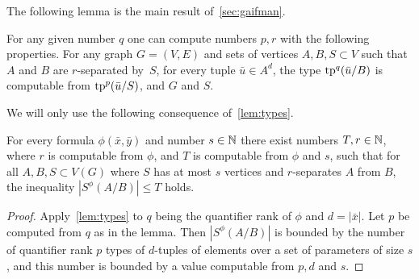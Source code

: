 The following lemma is the main result of~\cref{sec:gaifman}.




\begin{lemma}%
	\label{lem:types}
For any given number $q$
one can compute numbers $p,r$ with the following properties.	For any graph $G=(V,E)$ and sets of vertices $A,B,S\subset V$	
	such that $A$  and $B$ are $r$-separated by~$S$,
	for every tuple $\bar u\in A^{d}$, 
	the type $\mathrm{tp}^q(\bar u/B)$
	is computable from  $\mathrm{tp}^{p}(\bar u/S)$, and $G$ and $S$.
 
  
  
\end{lemma}


We will  only use the following consequence of~\cref{lem:types}.

\begin{corollary}\label{cor:bound}
For every formula $\phi(\bar x,\bar y)$ 
and number $s\in \mathbb{N}$
there exist numbers $T,r\in \mathbb{N}$,
where $r$ is computable from $\phi$, and $T$ is computable from $\phi$ and $s$,
  such that for all $A,B,S\subset V(G)$ 
  where $S$ has at most $s$ vertices and  $r$-separates $A$ from $B$, the inequality 
  $|S^\phi(A/B)|\le T$ holds.
\end{corollary}
\begin{proof}
 Apply~\cref{lem:types} to $q$ being the quantifier rank of $\phi$ and $d=|\bar x|$. Let 
  $p$ be  computed from $q$ as in the lemma.
 Then $|S^\phi(A/B)|$ is bounded by the number of quantifier rank $p$ types of $d$-tuples of elements over a set of parameters of size $s$, and this number  is bounded by a value computable from $p,d$ and $s$.
\end{proof}




